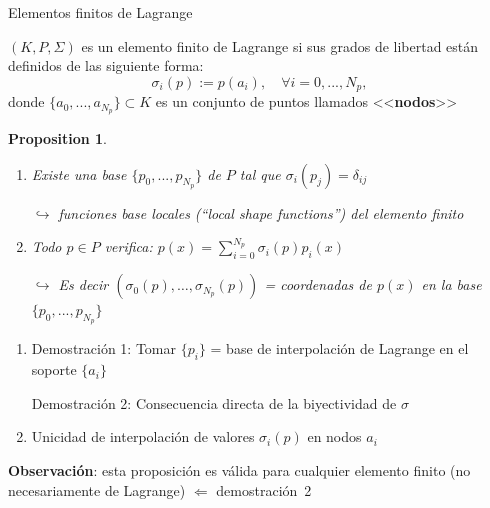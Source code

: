 \documentclass[9pt,leqno]{beamer}
\newcommand{\Np}{{N_p}}
\newtheorem{proposition}{Proposition}
\begin{document}
\begin{frame}{Elementos finitos de Lagrange}

  \begin{definition} $(K,P,\Sigma)$ es un \alert{elemento finito de
      Lagrange} si sus grados de libertad están definidos de las siguiente
    forma:
    $$
    \sigma_i(p) := p(a_i), \quad \forall i=0,...,\Np,
    $$
    donde $\{a_0,...,a_\Np\} \subset K$ es un conjunto de puntos
    llamados <<\textbf{nodos}>>
  \end{definition}
\pause
\begin{proposition}
  \begin{enumerate}
  \item Existe una base $\{p_0,...,p_\Np\}$ de $P$ tal que
    $\sigma_i(p_j)=\delta_{ij}$
    \begin{flushright} \scriptsize $\hookrightarrow$  \alert{funciones base} locales
      (``\textit{local shape functions}'') del elemento finito
    \end{flushright}
  \item Todo $p\in P$ verifica: $p(x)=\sum_{i=0}^\Np \sigma_i(p) p_i(x)$
    \begin{flushright} \scriptsize $\hookrightarrow$ Es decir
      \alert{$(\sigma_0(p),\dots,\sigma_\Np(p))$ = coordenadas de
        $p(x)$ }en la base $\{p_0,...,p_\Np\}$
    \end{flushright}
  \end{enumerate}
\end{proposition}

\begin{footnotesize}
  \begin{enumerate}
  \item Demostración 1: Tomar $\{p_i\}$ = base de interpolación de
    Lagrange en el soporte $\{a_i\}$ %
    \par
    Demostración 2: Consecuencia directa de la biyectividad de $\sigma$
    \item
    Unicidad de interpolación de valores $\sigma_i(p)$ en nodos $a_i$
  \end{enumerate}
\end{footnotesize}

\textbf{Observación}: \alert{esta proposición es válida para
  cualquier elemento finito} (no necesariamente de Lagrange)
\small
$\Leftarrow$ demostración~2
\end{frame}
\end{document}
